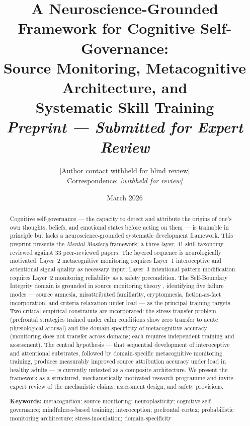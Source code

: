 \documentclass[12pt, a4paper]{article}
\title{\textbf{A Neuroscience-Grounded Framework for Cognitive Self-Governance: \\
       Source Monitoring, Metacognitive Architecture, and \\
       Systematic Skill Training} \\[0.5em]
       \large \textit{Preprint --- Submitted for Expert Review}}
\author{[Author contact withheld for blind review]\\[0.3em]
        \small Correspondence: \textit{[withheld for review]}}
\date{March 2026}
\begin{document}
\maketitle
\thispagestyle{empty}

\begin{abstract}
\noindent
Cognitive self-governance --- the capacity to detect and attribute the origins of
one's own thoughts, beliefs, and emotional states before acting on them --- is
trainable in principle but lacks a neuroscience-grounded systematic development
framework. This preprint presents the \textit{Mental Mastery} framework: a
three-layer, 41-skill taxonomy reviewed against 33 peer-reviewed papers. The layered
sequence is neurologically motivated: Layer~2 metacognitive monitoring requires
Layer~1 interoceptive and attentional signal quality as necessary input; Layer~3
intentional pattern modification requires Layer~2 monitoring reliability as a
safety precondition. The Self-Boundary Integrity domain is grounded in source
monitoring theory \citep{johnson1993, mitchell2009, simons2008}, identifying five
failure modes --- source amnesia, misattributed familiarity, cryptomnesia,
fiction-as-fact incorporation, and criteria relaxation under load --- as the
principal training targets. Two critical empirical constraints are incorporated:
the stress-transfer problem \citep{raio2013} (prefrontal strategies trained under
calm conditions show zero transfer to acute physiological arousal) and the
domain-specificity of metacognitive accuracy \citep{morales2018, fleming2014}
(monitoring does not transfer across domains; each requires independent training
and assessment). The central hypothesis --- that sequential development of
interoceptive and attentional substrates, followed by domain-specific metacognitive
monitoring training, produces measurably improved source attribution accuracy
under load in healthy adults --- is currently untested as a composite architecture.
We present the framework as a structured, mechanistically motivated research
programme and invite expert review of the mechanistic claims, assessment design,
and safety provisions.

\medskip\noindent
\textbf{Keywords:} metacognition; source monitoring; neuroplasticity; cognitive
self-governance; mindfulness-based training; interoception; prefrontal cortex;
probabilistic monitoring architecture; stress-inoculation; domain-specificity
\end{abstract}
\end{document}
